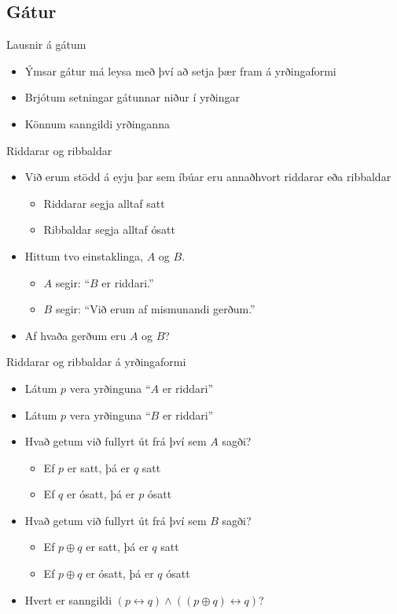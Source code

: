 \documentclass[handout]{beamer}
\begin{document}
\subsection{Gátur}

\begin{frame}{Lausnir á gátum}
\begin{itemize}
 \item Ýmsar gátur má leysa með því að setja þær fram á yrðingaformi
 \item Brjótum setningar gátunnar niður í yrðingar
 \item Könnum sanngildi yrðinganna
\end{itemize}
\end{frame}

\begin{frame}{Riddarar og ribbaldar}
\pause
\begin{itemize}
 \item Við erum stödd á eyju þar sem íbúar eru annaðhvort riddarar eða ribbaldar
 \begin{itemize}
  \item Riddarar segja alltaf satt
  \item Ribbaldar segja alltaf ósatt
 \end{itemize}
 \item Hittum tvo einstaklinga, $A$ og $B$. 
 \begin{itemize}
  \item $A$ segir: ``$B$ er riddari.''
  \item $B$ segir: ``Við erum af mismunandi gerðum.''
 \end{itemize}
 \item Af hvaða gerðum eru $A$ og $B$?
\end{itemize}
\end{frame}

\begin{frame}{Riddarar og ribbaldar á yrðingaformi}
\begin{itemize}
 \item Látum $p$ vera yrðinguna ``$A$ er riddari''
 \item Látum $p$ vera yrðinguna ``$B$ er riddari''
 \item Hvað getum við fullyrt út frá því sem $A$ sagði? \pause
 \begin{itemize}
  \item Ef $p$ er satt, þá er $q$ satt
  \item Ef $q$ er ósatt, þá er $p$ ósatt
 \end{itemize}
 \item Hvað getum við fullyrt út frá því sem $B$ sagði? \pause
 \begin{itemize}
  \item Ef $p \oplus q$ er satt, þá er $q$ satt
  \item Ef $p \oplus q$ er ósatt, þá er $q$ ósatt
 \end{itemize}
 \item Hvert er sanngildi $(p \leftrightarrow q) \land ((p \oplus q) \leftrightarrow q)$?
\end{itemize}
\end{frame}
\end{document}
